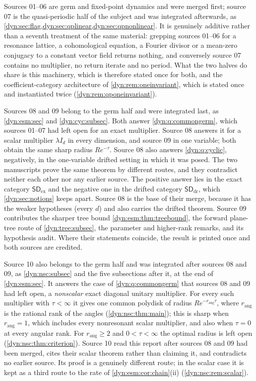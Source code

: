 \documentclass[11pt,letterpaper]{article}
\theoremstyle{definition}
\theoremstyle{remark}
\newcommand{\sddr}{\mathsf{SD}_{\mathrm{dr}}}
\newcommand{\sdex}{\mathsf{SD}_{\mathrm{ex}}}
\newcommand{\rang}{r_{\mathrm{ang}}}
\numberwithin{equation}{section}
\begin{document}
Sources 01--06 are germ and fixed-point dynamics and were merged first;
source 07 is the quasi-periodic half of the subject and was integrated
afterwards, as \cref{dyn:sec:flag,dyn:sec:qplinear,dyn:sec:qpnonlinear}.
It is genuinely additive rather than a seventh treatment of the same
material: grepping sources 01--06 for a resonance lattice, a cohomological
equation, a Fourier divisor or a mean-zero conjugacy to a constant vector
field returns nothing, and conversely source 07 contains no multiplier, no
return iterate and no period. What the two halves do share is this
machinery, which is therefore stated once for both, and the
coefficient-category architecture of \cref{dyn:rem:oneinvariant}, which is
stated once and instantiated twice
(\cref{dyn:rem:qponeinvariant}).

Sources 08 and 09 belong to the germ half and were integrated last, as
\cref{dyn:esm:sec} and \cref{dyn:cyc:subsec}. Both answer
\cref{dyn:q:commongerm}, which sources 01--07 had left open for an exact
multiplier. Source 08 answers it for a scalar multiplier $\lambda I_d$ in
every dimension, and source 09 in one variable; both obtain the same sharp
radius $Re^{-\tau}$. Source 08 also answers \cref{dyn:q:cyclic}, negatively,
in the one-variable drifted setting in which it was posed. The two
manuscripts prove the same theorem by different routes, and they contradict
neither each other nor any earlier source. The positive answer lies in the
exact category $\sdex$ and the negative one in the drifted category $\sddr$,
which \cref{dyn:sec:notions} keeps apart. Source 08 is the base of their
merge, because it has the weaker hypotheses (every $d$) and also carries the
drifted theorem. Source 09 contributes the sharper tree bound
\cref{dyn:esm:thm:treebound}, the forward plane-tree route of
\cref{dyn:tree:subsec}, the parameter and higher-rank remarks, and its
hypothesis audit. Where their statements coincide, the result is printed once
and both sources are credited.

Source 10 also belongs to the germ half and was integrated after sources 08
and 09, as \cref{dyn:nsc:subsec} and the five subsections after it, at the
end of \cref{dyn:esm:sec}. It answers the case of \cref{dyn:q:commongerm}
that sources 08 and 09 had left open, a \emph{nonscalar} exact diagonal
unitary multiplier. For every such multiplier with $\tau<\infty$ it gives
one common polydisk of radius $Re^{-\rang\tau}$, where $\rang$ is the
rational rank of the angles (\cref{dyn:nsc:thm:main}); this is sharp when
$\rang=1$, which includes every nonresonant scalar multiplier, and also
when $\tau=0$ at every angular rank. For $\rang\ge2$ and $0<\tau<\infty$
the optimal radius is left open (\cref{dyn:nsc:thm:criterion}). Source 10 read
this report after sources 08 and 09 had been merged, cites their scalar
theorem rather than claiming it, and contradicts no earlier source. Its
proof is a genuinely different route; in the scalar case it is kept as a
third route to the rate of \cref{dyn:esm:cor:chain}(ii)
(\cref{dyn:nsc:rem:scalar}).
\end{document}
